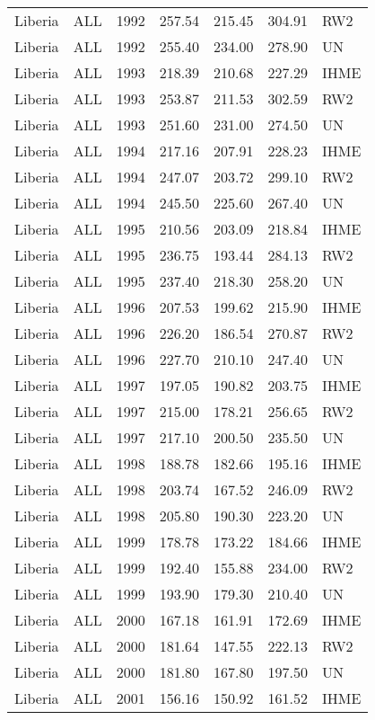 \begin{longtable}{lllrrrl}
  Liberia & ALL & 1992 & 257.54 & 215.45 & 304.91 & RW2 \\ 
  Liberia & ALL & 1992 & 255.40 & 234.00 & 278.90 & UN \\ 
  Liberia & ALL & 1993 & 218.39 & 210.68 & 227.29 & IHME \\ 
  Liberia & ALL & 1993 & 253.87 & 211.53 & 302.59 & RW2 \\ 
  Liberia & ALL & 1993 & 251.60 & 231.00 & 274.50 & UN \\ 
  Liberia & ALL & 1994 & 217.16 & 207.91 & 228.23 & IHME \\ 
  Liberia & ALL & 1994 & 247.07 & 203.72 & 299.10 & RW2 \\ 
  Liberia & ALL & 1994 & 245.50 & 225.60 & 267.40 & UN \\ 
  Liberia & ALL & 1995 & 210.56 & 203.09 & 218.84 & IHME \\ 
  Liberia & ALL & 1995 & 236.75 & 193.44 & 284.13 & RW2 \\ 
  Liberia & ALL & 1995 & 237.40 & 218.30 & 258.20 & UN \\ 
  Liberia & ALL & 1996 & 207.53 & 199.62 & 215.90 & IHME \\ 
  Liberia & ALL & 1996 & 226.20 & 186.54 & 270.87 & RW2 \\ 
  Liberia & ALL & 1996 & 227.70 & 210.10 & 247.40 & UN \\ 
  Liberia & ALL & 1997 & 197.05 & 190.82 & 203.75 & IHME \\ 
  Liberia & ALL & 1997 & 215.00 & 178.21 & 256.65 & RW2 \\ 
  Liberia & ALL & 1997 & 217.10 & 200.50 & 235.50 & UN \\ 
  Liberia & ALL & 1998 & 188.78 & 182.66 & 195.16 & IHME \\ 
  Liberia & ALL & 1998 & 203.74 & 167.52 & 246.09 & RW2 \\ 
  Liberia & ALL & 1998 & 205.80 & 190.30 & 223.20 & UN \\ 
  Liberia & ALL & 1999 & 178.78 & 173.22 & 184.66 & IHME \\ 
  Liberia & ALL & 1999 & 192.40 & 155.88 & 234.00 & RW2 \\ 
  Liberia & ALL & 1999 & 193.90 & 179.30 & 210.40 & UN \\ 
  Liberia & ALL & 2000 & 167.18 & 161.91 & 172.69 & IHME \\ 
  Liberia & ALL & 2000 & 181.64 & 147.55 & 222.13 & RW2 \\ 
  Liberia & ALL & 2000 & 181.80 & 167.80 & 197.50 & UN \\ 
  Liberia & ALL & 2001 & 156.16 & 150.92 & 161.52 & IHME \\ 

\end{longtable}
